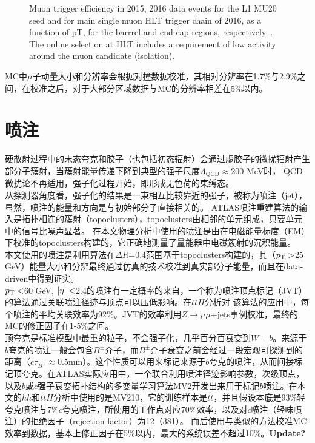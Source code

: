 \begin{figure}[h]
\begin{center}
\begin{subfigure}[b]{0.45\textwidth}
      \caption{}
      \label{fig:muon_trigger_eff_pt_endcap}
  \end{subfigure}
\caption{Muon trigger efficiency in 2015, 2016 data events for the L1 MU20 seed and for main single muon HLT trigger chain of 2016, as a function of pT, for the barrrel and end-cap regions, respectively~\cite{Muon-trigger-results}. The online selection at HLT includes a requirement of low activity around the muon candidate (isolation).} 
 \label{fig:muon_trigger_eff}
\end{center}
\end{figure}
MC中$\mu$子动量大小和分辨率会根据对撞数据校准\cite{Aad2016-mu2016}，其相对分辨率在1.7\%与2.9\%之间，在校准之后，对于大部分\abseta 区域数据与MC的分辨率相差在5\%以内。

\section{喷注}
硬散射过程中的末态夸克和胶子（也包括初态辐射）会通过虚胶子的微扰辐射产生部分子簇射，当簇射能量传递下降到典型的强子尺度$\Lambda_{\text{QCD}}\approx$200 MeV时，
QCD微扰论不再适用，强子化过程开始，即形成无色荷的束缚态。\\
从探测器角度看，强子化的结果是一束相互比较靠近的强子，被称为喷注（jet），显然，喷注的能量和方向是与初始部分子直接相关的。
ATLAS喷注重建算法的输入是拓扑相连的簇射（topoclusters），topoclusters由相邻的单元组成，只要单元中的信号比噪声显著\cite{Aad:2016upy}。 
在本文物理分析中使用的喷注是由在电磁能量标度（EM）下校准的topoclusters构建的，它正确地测量了量能器中电磁簇射的沉积能量\cite{ATLAS-CONF-2013-004}。\\
本文使用的喷注是利用\antikt 算法\cite{Cacciari:2008gp}在$\Delta R$=0.4范围基于topoclusters构建的，其（$p_{\text{T}}>$25 GeV）能量大小和分辨最终通过仿真的技术校准到真实部分子能量，而且在data-driven中得到证实\cite{TheATLAScollaboration:2015soq,TheATLAScollaboration:2013pia}。\\
$p_{\text{T}}<$60 GeV, $|\eta|<$2.4的喷注有一定概率的来自\pileup ，一个称为喷注顶点标记（JVT）\cite{ATLAS:2014cva}的算法通过关联喷注径迹与顶点可以压低\pileup 影响。在$t\bar{t}H$分析对
该算法的应用中，每个喷注的平均关联效率为92\%。JVT的效率利用$Z\rightarrow \mu\mu$+jets事例校准，最终的MC的修正因子在1-5\%之间。\\
顶夸克是标准模型中最重的粒子，不会强子化，几乎百分百衰变到$W+b$。来源于$b$夸克的喷注一般会包含$B^{\pm}$介子，而$B^{\pm}$介子衰变之前会经过一段宏观可探测到的距离（$c\tau_{B^{\pm}}\approx0.5\text{mm}$）。这个性质可以用来标记来源于$b$夸克的喷注，从而间接标记顶夸克。在ATLAS实际应用中，一个联合利用喷注径迹影响参数，次级顶点，
以及$b$或$c$强子衰变拓扑结构的多变量学习算法MV2\cite{ATL-PHYS-PUB-2015-022,ATL-PHYS-PUB-2016-012}开发出来用于标记$b$喷注。在本文的$hh$和$t\bar{t}H$分析中使用的是MV210，它的训练样本是$t\bar{t}$，并且假设本底是93\%轻
夸克喷注与7\%$c$夸克喷注，所使用的工作点对应70\%\btag 效率，以及对$c$喷注（轻味喷注）的拒绝因子（rejection factor）为12（381）。
而后使用与\RunOne 类似的方法\cite{Aad:2015ydr}校准MC\btag 效率到数据，基本上修正因子在5\%以内，最大的系统误差不超过10\%。\textbf{Update?}


